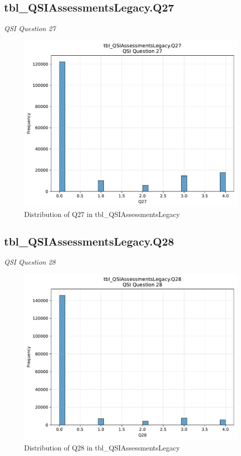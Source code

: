 \subsection{tbl\_QSIAssessmentsLegacy.Q27}
\textit{QSI Question 27}

\begin{figure}[htbp]
\centering
\includegraphics[width=\textwidth]{figures/dbo_tbl_QSIAssessmentsLegacy_Q27.pdf}
\caption{Distribution of Q27 in tbl\_QSIAssessmentsLegacy}
\end{figure}\newpage

\subsection{tbl\_QSIAssessmentsLegacy.Q28}
\textit{QSI Question 28}

\begin{figure}[htbp]
\centering
\includegraphics[width=\textwidth]{figures/dbo_tbl_QSIAssessmentsLegacy_Q28.pdf}
\caption{Distribution of Q28 in tbl\_QSIAssessmentsLegacy}
\end{figure}\newpage

